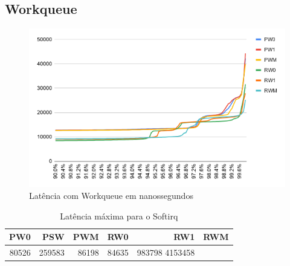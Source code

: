 \subsection{Workqueue}

\begin{figure}[H]
  \centering
        \includegraphics[width=\textwidth]{graficos/workqueue.png}
        \caption{Latência com Workqueue em nanossegundos}
        \label{grafico:workqueue}
\end{figure}

\begin{table}[H]
\centering
\begin{center}
\begin{tabular}{|r|r|r|r|r|r|}
\toprule
    PW0 &    PSW &    PWM &    RW0 &     RW1 &    RWM \\
\midrule
    80526 &	259583 &	86198 & 84635 &	983798 	4153458 \\
\bottomrule
\end{tabular}
\end{center}
\caption{Latência máxima para o Softirq}
\label{table:max-softirq}
\end{table}
